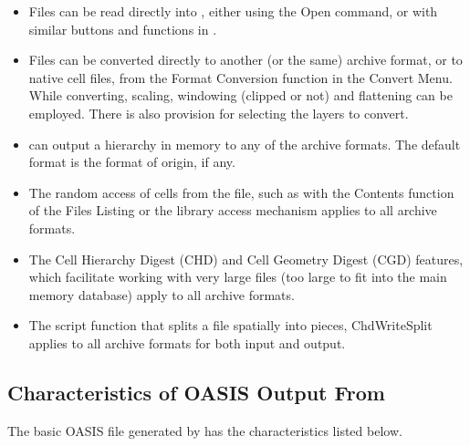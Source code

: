 \begin{itemize}
\item{Files can be read directly into {\Xic}, either using the {\cb
Open} command, or with similar buttons and functions in {\Xic}.}

\item{Files can be converted directly to another (or the same) archive
format, or to {\Xic} native cell files, from the {\cb Format Conversion}
function in the {\cb Convert Menu}.  While converting, scaling,
windowing (clipped or not) and flattening can be employed.  There is
also provision for selecting the layers to convert.}

\item{{\Xic} can output a hierarchy in memory to any of the
archive formats.  The default format is the format of origin, if
any.}

\item{The random access of cells from the file, such as with the {\cb
Contents} function of the {\cb Files Listing} or the library access
mechanism applies to all archive formats.}

\item{The Cell Hierarchy Digest (CHD) and Cell Geometry Digest (CGD)
features, which facilitate working with very large files (too large to
fit into the main memory database) apply to all archive formats.}

\item{The script function that splits a file spatially into pieces,
{\vt ChdWriteSplit} applies to all archive formats for both input and
output.}
\end{itemize}

\subsection{Characteristics of OASIS Output From {\Xic}}

The basic OASIS file generated by {\Xic} has the characteristics
listed below.

